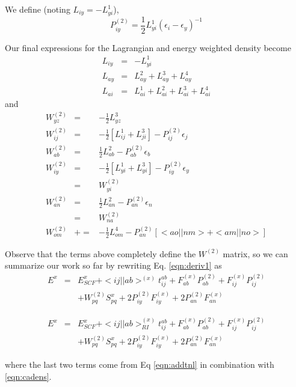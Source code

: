 \documentclass[fleqn,12pt]{article}
\newcommand{\half}{\frac{1}{2}}
\newcommand{\bra}{<\!}
\newcommand{\ket}{\!>}
\newcommand{\tijab}{{t_{ij}^{ab}}}
\newcommand{\Ptwo}{P^{(2)}}
\newcommand{\Wtwo}{W^{(2)}}
\newcommand{\Fx}{F^{(x)}}
\newcommand{\intari}[2]{\bra #1 || #2 \ket_{RI}}
\begin{document}
We define (noting $L_{iy}=-L^1_{yi}$), 
\begin{equation}
\label{eqn:cadens}
  \Ptwo_{iy} = \half L^1_{yi} \left( \epsilon_i -  \epsilon_y  \right)^{-1}
\end{equation}

Our final expressions for the Lagrangian and energy weighted density
become
\begin{eqnarray}
  L_{iy} & = & -L^1_{yi} \\
  L_{ay} & = & L^2_{ay} + L^3_{ay} + L^4_{ay} \\
  L_{ai} & = & L^1_{ai} + L^2_{ai} + L^3_{ai} + L^4_{ai}
\end{eqnarray}
and
\begin{eqnarray}
  \Wtwo_{yz} & = & -\half L^3_{yz} \label{eqn:wtwofirst}\\
  \Wtwo_{ij} & = & -\half \left[ L^1_{ij} + L^3_{ji} \right]  -
  \Ptwo_{ij} \epsilon_j   \\
  \Wtwo_{ab} & = & \half L^2_{ab} - \Ptwo_{ab} \epsilon_b \\
  \Wtwo_{iy} & = & -\half\left[ L^1_{yi} + L^3_{yi} \right] -
  \Ptwo_{iy} \epsilon_y  \\
         & = & \Wtwo_{yi} \\
  \Wtwo_{an} & = & \half L^2_{an} - \Ptwo_{an} \epsilon_n \\
         & = & \Wtwo_{na} \\
  \Wtwo_{om} & += & -\half L^4_{om}  - \Ptwo_{an} \left[ \bra ao||nm \ket
    + \bra am||no \ket \right] \label{eqn:wtwolast}
\end{eqnarray}


Observe that the terms above completely define the $\Wtwo$ matrix, so
we can summarize our work so far by rewriting Eq. \ref{eqn:deriv1} as
\begin{eqnarray}
 E^x & = & E^x_{SCF} + \bra ij || ab \ket^{(x)} \tijab + \Fx_{ab} \Ptwo_{ab}
  + \Fx_{ij} \Ptwo_{ij} \\
 & & + \Wtwo_{pq} S^{x}_{pq} + 2 \Ptwo_{iy} \Fx_{iy} + 2 \Ptwo_{an}
  \Fx_{an} \nonumber
\end{eqnarray}
\begin{changebar}
\begin{eqnarray}
 E^x & = & E^x_{SCF} + \intari{ij}{ab}^{(x)} \tijab + \Fx_{ab} \Ptwo_{ab}
  + \Fx_{ij} \Ptwo_{ij} \\
 & & + \Wtwo_{pq} S^{x}_{pq} + 2 \Ptwo_{iy} \Fx_{iy} + 2 \Ptwo_{an}
  \Fx_{an} \nonumber
\end{eqnarray}
\end{changebar}
where the last two terms come from Eq \ref{eqn:addtnl} in combination
with \ref{eqn:cadens}.
\end{document}
